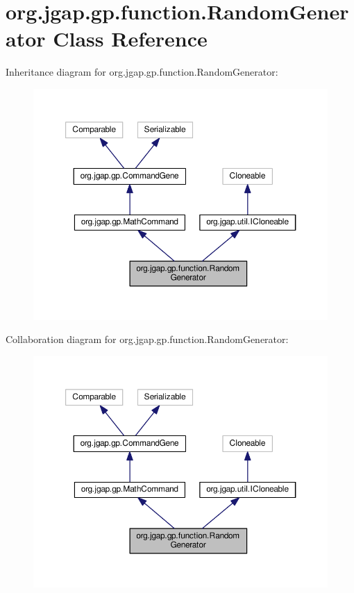 \hypertarget{classorg_1_1jgap_1_1gp_1_1function_1_1_random_generator}{\section{org.\-jgap.\-gp.\-function.\-Random\-Generator Class Reference}
\label{classorg_1_1jgap_1_1gp_1_1function_1_1_random_generator}
}


Inheritance diagram for org.\-jgap.\-gp.\-function.\-Random\-Generator\-:
\nopagebreak
\begin{figure}[H]
\begin{center}
\leavevmode
\includegraphics[width=350pt]{classorg_1_1jgap_1_1gp_1_1function_1_1_random_generator__inherit__graph}
\end{center}
\end{figure}


Collaboration diagram for org.\-jgap.\-gp.\-function.\-Random\-Generator\-:
\nopagebreak
\begin{figure}[H]
\begin{center}
\leavevmode
\includegraphics[width=350pt]{classorg_1_1jgap_1_1gp_1_1function_1_1_random_generator__coll__graph}
\end{center}
\end{figure}
